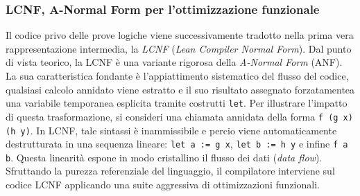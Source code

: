 \subsubsection{LCNF, A-Normal Form per l'ottimizzazione funzionale}
Il codice privo delle prove logiche viene successivamente tradotto nella prima vera rappresentazione intermedia, la \emph{LCNF} (\textit{Lean Compiler Normal Form}). Dal punto di vista teorico, la LCNF è una variante 
rigorosa della \textit{A-Normal Form} (ANF). La sua caratteristica fondante è l'appiattimento sistematico del flusso del codice, qualsiasi calcolo annidato viene estratto e il suo risultato assegnato forzatamentea una 
variabile temporanea esplicita tramite costrutti \texttt{let}. Per illustrare l'impatto di questa trasformazione, si consideri una chiamata annidata della forma \texttt{f (g x) (h y)}. In LCNF, tale sintassi è inammissibile 
e percio viene automaticamente destrutturata in una sequenza lineare: \texttt{let a := g x}, \texttt{let b := h y} e infine \texttt{f a b}. Questa linearità espone in modo cristallino il flusso dei dati (\textit{data flow}). 
Sfruttando la purezza referenziale del linguaggio, il compilatore interviene sul codice LCNF applicando una suite aggressiva di ottimizzazioni funzionali.
